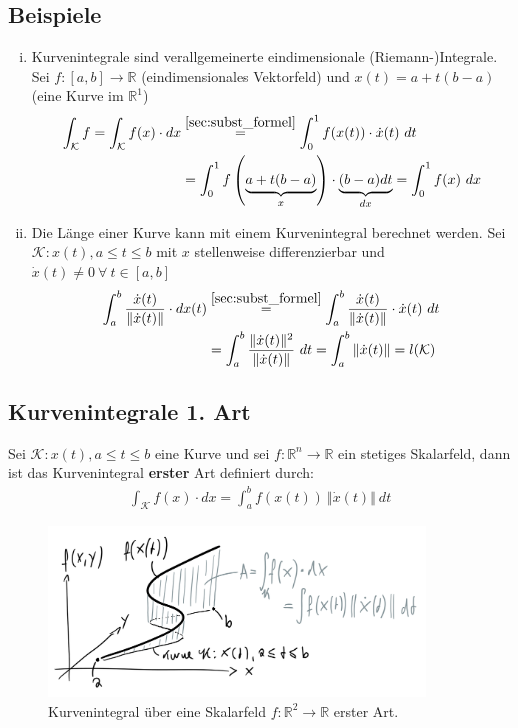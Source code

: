 \documentclass[11pt,a4paper]{book}
\newcommand {\R}	{\mathbb{R}}
\newcommand {\Rn}	{\mathbb{R}^n}
\newcommand {\Rzwei}	{\mathbb{R}^2}
\newcommand{\1}    	{\mathbbm{1}}
\newcommand{\Kurve}	{{\mathcal{K}}}
\begin{document}
\subsection{Beispiele}
\begin{enumerate}[(i)]
	\item Kurvenintegrale sind verallgemeinerte eindimensionale (Riemann-)Integrale. Sei \(f : [a,b] \rightarrow \R \) (eindimensionales Vektorfeld) und \(x(t) = a + t(b - a)\) (eine Kurve im \(\R^1\))
	\begin{align*}
		\int_\Kurve f = \int_\Kurve f(x) \cdot dx 
		&\stackrel{\ref{sec:subst_formel}}{=} 
		\int_0^1 f(x(t)) \cdot \dot{x}(t) ~dt \\
		&= 
		\int_0^1 f\left(\underbrace{a + t(b-a)}_{x}\right)\cdot \underbrace{(b-a) dt}_{dx} = \int_0^1 f(x) ~dx
	\end{align*}
	\item Die Länge einer Kurve kann mit einem Kurvenintegral berechnet werden. Sei \(\Kurve : x(t), a \leqslant t \leqslant b\) mit \(x\) stellenweise differenzierbar und \(\dot{x}(t) \neq 0 ~\forall~ t \in [a,b]\)
	\begin{align*}
		\int_a^b \frac{\dot{x}(t)}{\Vert \dot{x}(t) \Vert} \cdot dx(t) 
		&\stackrel{\ref{sec:subst_formel}}{=} 
		\int_a^b \frac{\dot{x}(t)}{\Vert \dot{x}(t) \Vert} \cdot \dot{x}(t) ~dt \\
		&= \int_a^b \frac{\Vert \dot{x}(t) \Vert^2}{\Vert \dot{x}(t) \Vert} ~dt = \int_a^b \Vert \dot{x}(t) \Vert = l(\Kurve)
	\end{align*}
\end{enumerate}

\subsection*{Kurvenintegrale 1. Art}
Sei \(\Kurve : x(t), a \leqslant t \leqslant b\) eine Kurve und sei \(f : \Rn \rightarrow \R\) ein stetiges Skalarfeld, dann ist das Kurvenintegral \textbf{erster} Art definiert durch:
\begin{align*}
	\int_\Kurve f(x) \cdot dx = \int_a^b f(x(t)) ~\Vert \dot{x}(t) \Vert ~dt
\end{align*}
\begin{figure}[!h]
  	\centering
 	\includegraphics[width=10cm]{grafiken/Kurvenint_erster_Art.png}
  	\caption{Kurvenintegral über eine Skalarfeld \(f:\Rzwei \rightarrow \R\) erster Art.}
\end{figure}
\end{document}
